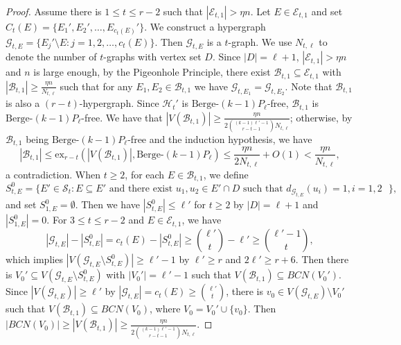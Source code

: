 \documentclass[10pt,a4paper]{amsart}
\newcommand{\ber}{\text{Berge-}}
\newcommand{\mg}{\mathcal{G}}
\newcommand{\mh}{\mathcal{H}}
\begin{document}
\begin{proof}
    Assume there is $1\le t\le r-2$ such that
 $|\mathcal{E}_{t,1}|>\eta n$. Let
  $E\in \mathcal{E}_{t,1}$ and set $C_t(E)=\{E_{1}',E_{2}',\ldots,E_{c_t(E)}'\}$.
   We construct a hypergraph $\mg_{t,E}=\{E_{j}'\setminus E : j=1,2,\ldots,c_t(E)\}$. Then $\mg_{t,E}$ is a $t$-graph. We use $N_{t,\ell}$ to denote the number of
   $t$-graphs with vertex set $D$. Since $|D|=\ell+1$, $|\mathcal{E}_{t,1}|>\eta n$ and $n$ is large enough, by the Pigeonhole Principle,  there exist $\mathcal{B}_{t,1}\subseteq \mathcal{E}_{t,1}$ with $|\mathcal{B}_{t,1}|\geq \frac{\eta n}{N_{t,\ell}}$ such that for any $E_1,E_2\in\mathcal{B}_{t,1}$ we have $\mg_{t,E_1}=\mg_{t,E_2}$. Note that $\mathcal{B}_{t,1}$ is also a $(r-t)$-hypergraph. Since  $\mh_t'$ is $\ber (k-1)P_{\ell}$-free, $\mathcal{B}_{t,1}$ is $\ber (k-1)P_{\ell}$-free. We have that $|V(\mathcal{B}_{t,1})|\ge
     \frac{\eta n}{2 \binom{(k-1)\ell'-1}{r-t-1}N_{t,\ell}}$; otherwise, by $\mathcal{B}_{t,1}$ being $\ber (k-1)P_{\ell}$-free and  the induction hypothesis, we have
     $$|\mathcal{B}_{t,1}|\leq \mathrm{ex}_{r-t}(|V(\mathcal{B}_{t,1})|,\ber (k-1)P_{\ell})\leq \frac{\eta n}{2 N_{t,\ell}}+O(1)<\frac{\eta n}{N_{t,\ell}},$$
      a contradiction.
      When $t\geq 2$, for each $E\in \mathcal{B}_{t,1}$, we define
     $$S_{t,E}^{0}=\{E'\in \mathcal{S}_{t} : \text{$E\subseteq E'$ and there exist $u_1,u_2\in E'\cap D$ such that $d_{\mg_{t,E}}(u_i)=1,i=1,2$ } \},$$
     and set $S_{1,E}^{0}=\emptyset$. Then we have $|S_{t,E}^{0}|\leq \ell'$ for $t\geq 2$ by $|D|=\ell+1$ and $|S_{1,E}^{0}|=0$.
          For $3\leq t\leq r-2$ and $E\in \mathcal{E}_{t,1}$, we have
     $$|\mg_{t,E}|-|S_{t,E}^{0}|=c_t(E)-|S_{t,E}^{0}|\geq\binom{\ell'}{t}-\ell'\geq \binom{\ell'-1}{t},$$
     which implies $|V(\mg_{t,E}\setminus S_{t,E}^{0})|\ge \ell'-1$ by  $\ell'\ge r$ and $2\ell'\ge r+6$. Then there is $V_0'\subseteq V(\mg_{t,E}\setminus S_{t,E}^{0})$ with $|V_0'|= \ell'-1$ such that $V(\mathcal{B}_{t,1})\subseteq BCN(V_0')$. Since  $|V(\mg_{t,E})|\ge \ell'$ by $|\mg_{t,E}|=c_t(E)\geq \binom{\ell'}{t}$, there is $v_0\in V(\mg_{t,E})\setminus V_0'$ such that $V(\mathcal{B}_{t,1})\subseteq BCN(V_0)$, where $V_0=V_0'\cup\{v_0\}$. Then  $|BCN(V_0)|\ge |V(\mathcal{B}_{t,1})|\ge \frac{\eta n}{2 \binom{(k-1)\ell'-1}{r-t-1}N_{t,\ell}}$.




\end{proof}
\end{document}

